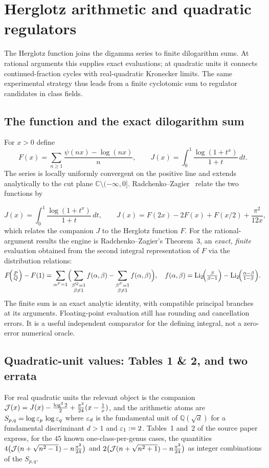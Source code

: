 \chapter{Herglotz arithmetic and quadratic regulators}
\label{ch:09-herglotz}

The Herglotz function joins the digamma series to finite dilogarithm sums.
At rational arguments this supplies exact evaluations; at quadratic units it
connects continued-fraction cycles with real-quadratic Kronecker limits.
The same experimental strategy thus leads from a finite cyclotomic sum to
regulator candidates in class fields.

\section{The function and the exact dilogarithm sum}
For $x>0$ define
\[
F(x)=\sum_{n\ge1}\frac{\psi(nx)-\log(nx)}n,
\qquad
J(x)=\int_0^1\frac{\log(1+t^x)}{1+t}\,dt.
\]
The series is locally uniformly convergent on the positive line and extends
analytically to the cut plane $\mathbb C\setminus(-\infty,0]$.
Radchenko--Zagier~\cite{RadchenkoZagier} relate the two functions by

\begin{equation}\label{herg:eq:Jint}
  J(x)=\int_0^1\frac{\log(1+t^{x})}{1+t}\,dt,\qquad J(x)=F(2x)-2F(x)+F(x/2)+\frac{\pi^2}{12x},
\end{equation}
which relates the companion $J$ to the Herglotz function $F$. For the rational-argument results the engine is
Radchenko--Zagier's Theorem~3, an \emph{exact, finite} evaluation obtained from the second integral
representation of $F$ via the distribution relations:
\begin{equation}\label{herg:eq:dilogsum}
  F\!\Bigl(\tfrac PQ\Bigr)-F(1)=\sum_{\alpha^P=1}\Bigl(\sum_{\substack{\beta^Q=1\\\beta\neq1}}f(\alpha,\beta)
  -\sum_{\substack{\beta^P=1\\\beta\neq1}}f(\alpha,\beta)\Bigr),\quad
  f(\alpha,\beta)=\operatorname{Li}_2\!\Bigl(\tfrac{\beta}{\beta-1}\Bigr)-\operatorname{Li}_2\!\Bigl(\tfrac{\alpha-\beta}{1-\beta}\Bigr).
\end{equation}
The finite sum is an exact analytic identity, with compatible principal
branches at its arguments. Floating-point evaluation still has rounding
and cancellation errors. It is a useful independent comparator for the
defining integral, not a zero-error numerical oracle.

\section{Quadratic-unit values: Tables 1 \& 2, and two errata}\label{herg:sec:tables}
For real quadratic units the relevant object is the companion
$\mathcal{J}(x)=J(x)-\tfrac{\log^2 2}{2}+\tfrac{\pi^2}{24}(x-\tfrac1x)$, and the arithmetic atoms are
$S_{p,q}=\log\varepsilon_p\,\log\varepsilon_q$ where $\varepsilon_d$ is the fundamental unit of $\mathbb Q(\sqrt d)$ for a
fundamental discriminant $d>1$ and $\varepsilon_1:=2$. Tables~1 and~2 of the source paper express, for the $45$
known one-class-per-genus cases, the quantities
$4\bigl(\mathcal{J}(n+\sqrt{n^2-1})-n\tfrac{\pi^2}{24}\bigr)$ and
$2\bigl(\mathcal{J}(n+\sqrt{n^2+1})-n\tfrac{\pi^2}{24}\bigr)$ as integer combinations of the $S_{p,q}$.

